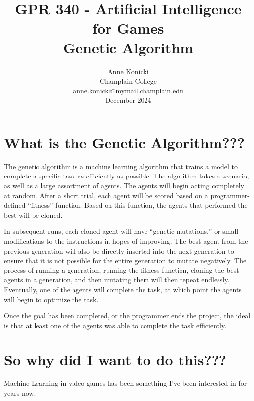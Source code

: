 \documentclass[twoside]{article}
\date{}
\begin{document}
    \title{GPR 340 - Artificial Intelligence for Games \\ Genetic Algorithm }
    \author{Anne Konicki \\ Champlain College \\ anne.konicki@mymail.champlain.edu \\ December 2024 }
    \maketitle


    \section{What is the Genetic Algorithm???}\label{sec:what-is-the-genetic-algorithm}
    The genetic algorithm is a machine learning algorithm that trains a model to complete a specific task as efficiently as possible.
    The algorithm takes a scenario, as well as a large assortment of agents.
    The agents will begin acting completely at random.
    After a short trial, each agent will be scored based on a programmer-defined ``fitness'' function.
    Based on this function, the agents that performed the best will be cloned.

    \bigbreak
    \noindent
    In subsequent runs, each cloned agent will have ``genetic mutations,'' or small modifications to the instructions in hopes of improving.
    The best agent from the previous generation will also be directly inserted into the next generation to ensure that it is not possible for the entire generation to mutate negatively.
    The process of running a generation, running the fitness function, cloning the best agents in a generation, and then mutating them will then repeat endlessly.
    Eventually, one of the agents will complete the task, at which point the agents will begin to optimize the task.

    \bigbreak
    \noindent
    Once the goal has been completed, or the programmer ends the project, the ideal is that at least one of the agents was able to complete the task efficiently.

    \section{So why did I want to do this???}\label{sec:so-why-did-i-want-to-do-this???}
    Machine Learning in video games has been something I've been interested in for years now.
\end{document}
